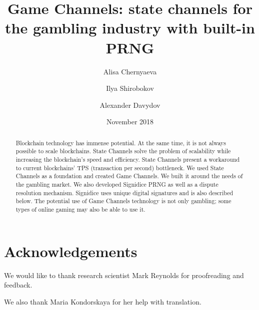 \documentclass[tikz, 12pt]{article}
\title {Game Channels: state channels for the gambling industry with built-in PRNG}
\author[1]{Alisa Chernyaeva}
\author[1]{Ilya Shirobokov}
\author[2]{Alexander Davydov}
\affil[1]{BlockProof Tech LLC\thanks{research@blockproof.tech}}
\affil[2]{DAO.Casino\thanks{research@dao.casino}}
\date {November 2018}
\theoremstyle{definition}
\theoremstyle{remark}
\begin{document}
\maketitle
	\begin{abstract}
Blockchain technology has immense potential. At the same time, it is not always possible to scale blockchains. State Channels solve the problem of scalability while increasing the blockchain's speed and efficiency. State Channels present a workaround to current blockchains' TPS (transaction per second) bottleneck. We used State Channels as a foundation and created Game Channels. We built it around the needs of the gambling market. We also developed Signidice PRNG as well as a dispute resolution mechanism. Signidice uses unique digital signatures and is also described below. The potential use of Game Channels technology is not only gambling; some types of online gaming may also be able to use it.

	\end{abstract}
\tableofcontents	
	
	
		

\section*{Acknowledgements}
We would like to thank research scientist Mark Reynolds for proofreading and feedback.

We also thank Maria Kondorskaya for her help with translation.  
\end{document}
